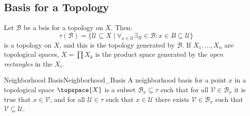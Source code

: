     \subsection{Basis for a Topology}
        Let $\mathscr{B}$ be a bsis for a topology on $X$. Then:
        \begin{equation}
            \tau(\mathscr{B})=\{\mathcal{U}\subseteq{X}\;|\;
                \forall_{x\in\mathcal{U}}\exists_B\in\mathscr{B}:
                x\in{B}\subseteq\mathcal{U}\}
        \end{equation}
        is a topology on $X$, and this is the topology generated by
        $\mathscr{B}$. If $X_{1},\dots,X_{n}$ are topological spaces,
        $X=\prod{X}_{k}$ is the product space generated by the
        \textit{open rectangles} in the $X_{i}$.
        \begin{fdefinition}{Neighborhood Basis}{Neighborhood_Basis}
            A neighborhood basis for a point $x$ in a topological space
            $\topspace{X}$ is a subset $\mathcal{B}_{x}\subseteq\tau$ such that
            for all $\mathcal{V}\in\mathcal{B}_{x}$ it is true that
            $x\in\mathcal{V}$, and for all $\mathcal{U}\in\tau$ such that
            $x\in\mathcal{U}$ there exists $\mathcal{V}\in\mathcal{B}_{x}$ such
            that $\mathcal{V}\subseteq\mathcal{U}$.
        \end{fdefinition}
